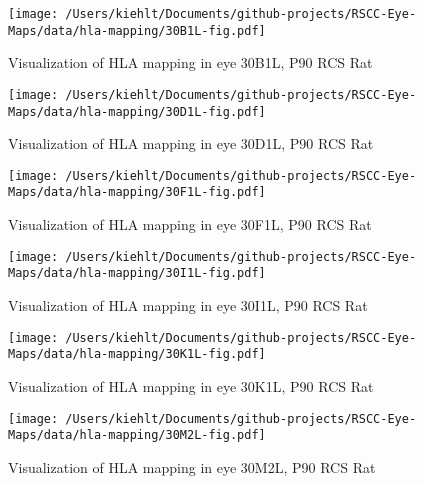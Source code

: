 \documentclass{article}
\begin{document}
\begin{center}
\begin{figure}
\texttt{[image: /Users/kiehlt/Documents/github-projects/RSCC-Eye-Maps/data/hla-mapping/30B1L-fig.pdf]}
\caption{Visualization of HLA mapping in eye 30B1L, P90 RCS Rat}
\label{fig:30B1L}
\end{figure}

\end{center}
\begin{center}
\begin{figure}
\texttt{[image: /Users/kiehlt/Documents/github-projects/RSCC-Eye-Maps/data/hla-mapping/30D1L-fig.pdf]}
\caption{Visualization of HLA mapping in eye 30D1L, P90 RCS Rat}
\label{fig:30D1L}
\end{figure}

\end{center}
\begin{center}
\begin{figure}
\texttt{[image: /Users/kiehlt/Documents/github-projects/RSCC-Eye-Maps/data/hla-mapping/30F1L-fig.pdf]}
\caption{Visualization of HLA mapping in eye 30F1L, P90 RCS Rat}
\label{fig:30F1L}
\end{figure}

\end{center}
\begin{center}
\begin{figure}
\texttt{[image: /Users/kiehlt/Documents/github-projects/RSCC-Eye-Maps/data/hla-mapping/30I1L-fig.pdf]}
\caption{Visualization of HLA mapping in eye 30I1L, P90 RCS Rat}
\label{fig:30I1L}
\end{figure}

\end{center}
\begin{center}
\begin{figure}
\texttt{[image: /Users/kiehlt/Documents/github-projects/RSCC-Eye-Maps/data/hla-mapping/30K1L-fig.pdf]}
\caption{Visualization of HLA mapping in eye 30K1L, P90 RCS Rat}
\label{fig:30K1L}
\end{figure}

\end{center}
\begin{center}
\begin{figure}
\texttt{[image: /Users/kiehlt/Documents/github-projects/RSCC-Eye-Maps/data/hla-mapping/30M2L-fig.pdf]}
\caption{Visualization of HLA mapping in eye 30M2L, P90 RCS Rat}
\label{fig:30M2L}
\end{figure}

\end{center}
\end{document}
